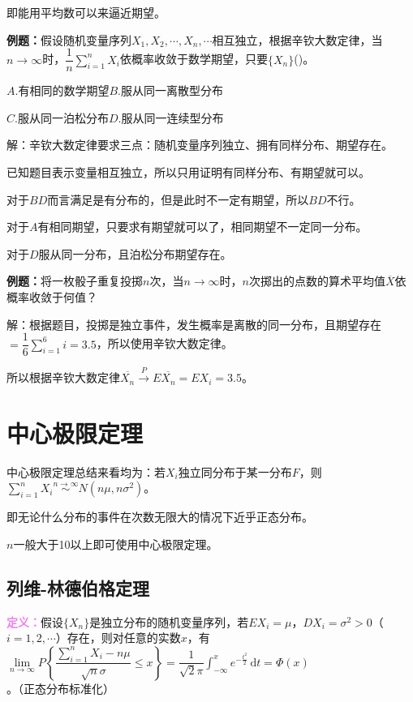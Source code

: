 即能用平均数可以来逼近期望。

\textbf{例题：}假设随机变量序列$X_1,X_2,\cdots,X_n,\cdots$相互独立，根据辛钦大数定律，当$n\to\infty$时，$\dfrac{1}{n}\sum\limits_{i=1}^nX_i$依概率收敛于数学期望，只要$\{X_n\}$()。

$A.$有相同的数学期望\qquad$B.$服从同一离散型分布

$C.$服从同一泊松分布\qquad$D.$服从同一连续型分布

解：辛钦大数定律要求三点：随机变量序列独立、拥有同样分布、期望存在。

已知题目表示变量相互独立，所以只用证明有同样分布、有期望就可以。

对于$BD$而言满足是有分布的，但是此时不一定有期望，所以$BD$不行。

对于$A$有相同期望，只要求有期望就可以了，相同期望不一定同一分布。

对于$D$服从同一分布，且泊松分布期望存在。

\textbf{例题：}将一枚骰子重复投掷$n$次，当$n\to\infty$时，$n$次掷出的点数的算术平均值$\overline{X}$依概率收敛于何值？

解：根据题目，投掷是独立事件，发生概率是离散的同一分布，且期望存在$=\dfrac{1}{6}\sum\limits_{i=1}^6i=3.5$，所以使用辛钦大数定律。

所以根据辛钦大数定律$\overline{X_n}\overset{P}{\rightarrow}E\overline{X_n}=EX_i=3.5$。

\section{中心极限定理}

中心极限定理总结来看均为：若$X_i$独立同分布于某一分布$F$，则$\sum\limits_{i=1}^nX_i\overset{n\to\infty}{\sim}N(n\mu,n\sigma^2)$。

即无论什么分布的事件在次数无限大的情况下近乎正态分布。

$n$一般大于10以上即可使用中心极限定理。

\subsection{列维-林德伯格定理}

\textcolor{violet}{\textbf{定义：}}假设$\{X_n\}$是独立分布的随机变量序列，若$EX_i=\mu$，$DX_i=\sigma^2>0$（$i=1,2,\cdots$）存在，则对任意的实数$x$，有$\lim\limits_{n\to\infty}P\left\{\dfrac{\sum\limits_{i=1}^nX_i-n\mu}{\sqrt{n}\sigma}\leqslant x\right\}=\dfrac{1}{\sqrt{2}\pi}\int_{-\infty}^xe^{-\frac{t^2}{2}}\,\textrm{d}t=\varPhi(x)$。（正态分布标准化）

